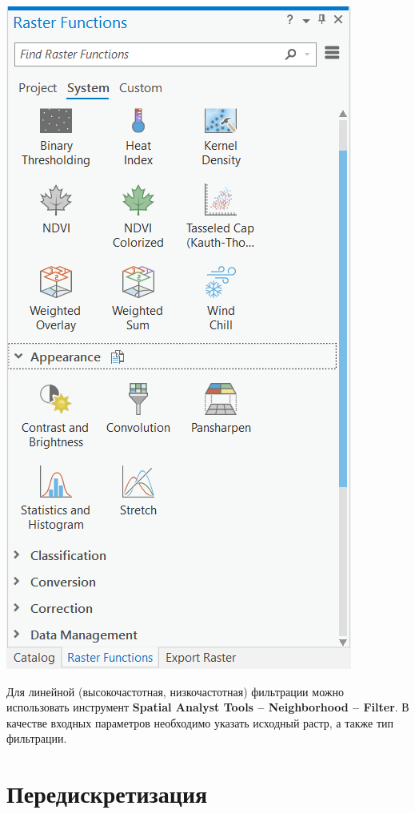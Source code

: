 \documentclass[
  12pt,
]{book}
\begin{document}
\includegraphics{images/Ref01/Raster_functions.png}

Для линейной (высокочастотная, низкочастотная) фильтрации можно использовать инструмент \textbf{Spatial Analyst Tools -- Neighborhood -- Filter}. В качестве входных параметров необходимо указать исходный растр, а также тип фильтрации.

\hypertarget{pansharpen-resampling}{%
\section{Передискретизация}\label{pansharpen-resampling}}
\end{document}
